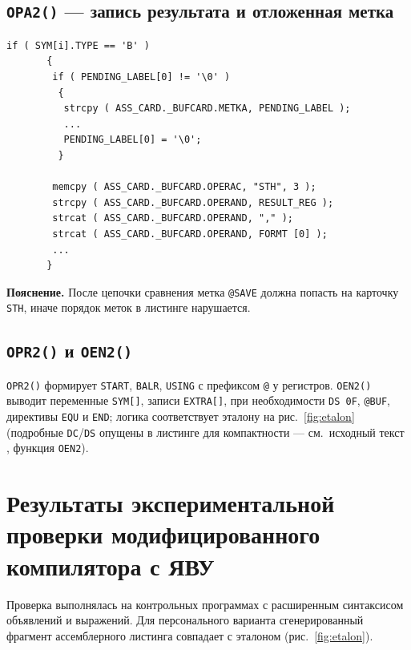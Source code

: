 \documentclass[a4paper,14pt]{extarticle}
\newcommand{\fpath}[1]{\texttt{\detokenize{#1}}}
\begin{document}
\subsection{\texttt{OPA2()} — запись результата и отложенная метка}

\begin{lstlisting}[style=Cstyle,caption={\texttt{STH} с \texttt{PENDING\_LABEL} и \texttt{RESULT\_REG}},label=lst:opa2]
      if ( SYM[i].TYPE == 'B' )
       {
        if ( PENDING_LABEL[0] != '\0' )
         {
          strcpy ( ASS_CARD._BUFCARD.METKA, PENDING_LABEL );
          ...
          PENDING_LABEL[0] = '\0';
         }

        memcpy ( ASS_CARD._BUFCARD.OPERAC, "STH", 3 );
        strcpy ( ASS_CARD._BUFCARD.OPERAND, RESULT_REG );
        strcat ( ASS_CARD._BUFCARD.OPERAND, "," );
        strcat ( ASS_CARD._BUFCARD.OPERAND, FORMT [0] );
        ...
       }
\end{lstlisting}
\textbf{Пояснение.} После цепочки сравнения метка \texttt{@SAVE} должна попасть на
карточку \texttt{STH}, иначе порядок меток в листинге нарушается.

\subsection{\texttt{OPR2()} и \texttt{OEN2()}}

\texttt{OPR2()} формирует \texttt{START}, \texttt{BALR}, \texttt{USING} с префиксом
\texttt{@} у регистров. \texttt{OEN2()} выводит переменные \texttt{SYM[]}, записи
\texttt{EXTRA[]}, при необходимости \texttt{DS 0F}, \texttt{@BUF}, директивы
\texttt{EQU} и \texttt{END}; логика соответствует эталону на
рис.~\ref{fig:etalon} (подробные \texttt{DC}/\texttt{DS} опущены в листинге для
компактности — см.\ исходный текст \fpath{komppl.c}, функция \texttt{OEN2}).

\section{Результаты экспериментальной проверки модифицированного компилятора с ЯВУ}

Проверка выполнялась на контрольных программах с расширенным синтаксисом
объявлений и выражений. Для персонального варианта сгенерированный фрагмент
ассемблерного листинга совпадает с эталоном (рис.~\ref{fig:etalon}).
\end{document}
